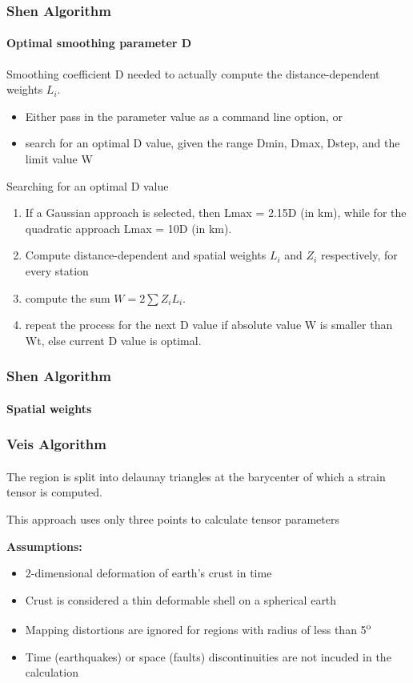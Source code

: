 \begin{frame}
  \frametitle{Shen Algorithm}
  \framesubtitle{Optimal smoothing parameter D}
  \label{ch2:}
 
  Smoothing coefficient D needed to actually compute the distance-dependent weights  $L_{i}$.
 
  \begin{itemize}
    \item Either pass in the parameter value as a command line option, or
    \item search for an optimal D value, given the range Dmin, Dmax, Dstep, and the limit value W
  \end{itemize}
  
  Searching for an optimal D value
  
  \begin{enumerate}
    \item If a Gaussian approach is selected, then Lmax = 2.15D (in km), while for the quadratic approach Lmax = 10D (in km).
    \item Compute distance-dependent and spatial weights $ L_{i} $ and $ Z_{i} $ respectively, for every station
    \item compute the sum $ W = 2\sum Z_{i} L_{i} $.
    \item repeat the process for the next D value if absolute value W is smaller than Wt, else current D value is optimal.
  \end{enumerate}
 
 

\end{frame}
\note{}

\begin{frame}
  \frametitle{Shen Algorithm}
  \framesubtitle{Spatial weights}
  \label{ch2:}
  
\end{frame}
\note{}

\begin{frame}
  \frametitle{Veis Algorithm}
  \framesubtitle{}
  \label{ch2:}
  
  The region is split into delaunay triangles at the barycenter of which a strain tensor is computed.
  
  This approach uses only three points to calculate tensor parameters
  
  \textbf{Assumptions:}
  \begin{itemize}
    \item 2-dimensional deformation of earth's crust in time
    \item Crust is considered a thin deformable shell on a spherical earth
    \item Mapping distortions are ignored for regions with radius of less than 5\textsuperscript{o}
    \item Time (earthquakes) or space (faults) discontinuities are not incuded in the calculation
  \end{itemize}
\end{frame}
\note{}

